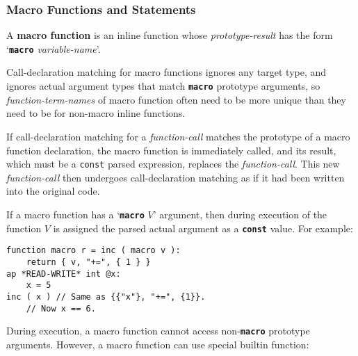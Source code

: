 \documentclass[12pt]{article}
\newcommand{\TT}[1]{{\tt \bfseries #1}}
\newcommand{\key}[1]{{\rm \bfseries #1}}
\newcommand{\ttkey}[1]{{\tt \bfseries #1}}
\newenvironment{indpar}[1][0.3in]%
	{\begin{list}{}%
		     {\setlength{\itemsep}{0in}%
		      \setlength{\topsep}{0in}%
		      \setlength{\parsep}{1ex}%
		      \setlength{\labelwidth}{#1}%
		      \setlength{\leftmargin}{#1}%
		      \addtolength{\leftmargin}{\labelsep}}%
	 \item}%
	{\end{list}}
\begin{document}
\subsubsection{Macro Functions and Statements}
\label{MACRO-FUNCTIONS-AND-STATEMENTS}

A \key{macro function} is an inline function whose
{\em prototype-result} has the form `\ttkey{macro} {\em variable-name}'.

Call-declaration matching for macro functions ignores any target type,
and ignores actual argument types that match \TT{macro} prototype arguments,
so {\em function-term-names} of macro function often need to be more unique
than they need to be for non-macro inline functions.

If call-declaration matching for a {\em function-call} matches the
prototype of a macro function declaration, the macro function is
immediately called, and its result, which must be a {\tt const} parsed
expression, replaces the {\em function-call}.  This new
{\em function-call} then undergoes call-declaration matching as if
it had been written into the original code.

If a macro function has a `\TT{macro} $V$' argument,
then during execution of the function $V$ is assigned the
parsed actual argument as a \TT{const} value.  For example:
\begin{indpar}[1em]\begin{verbatim}
function macro r = inc ( macro v ):
    return { v, "+=", { 1 } }
ap *READ-WRITE* int @x:
    x = 5
inc ( x ) // Same as {{"x"}, "+=", {1}}.
    // Now x == 6.
\end{verbatim}\end{indpar}

During execution, a macro function cannot access non-\TT{macro}
prototype arguments.  However, a macro function
can use special builtin function:
\end{document}
